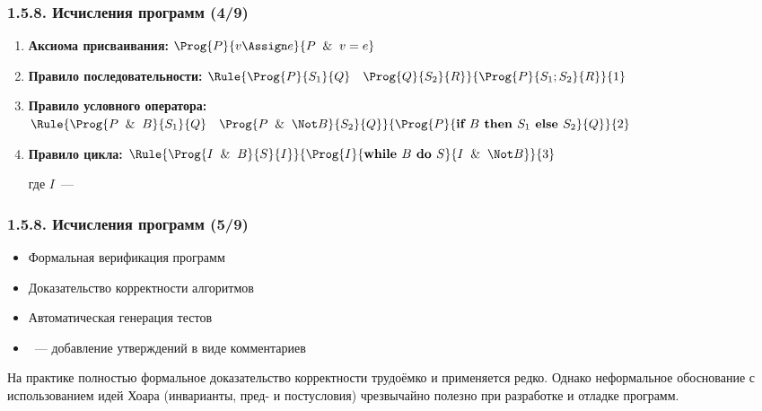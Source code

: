 \begin{frame}
\frametitle{1.5.8. Исчисления программ (4/9)}


\begin{enumerate}
\item \textbf{Аксиома присваивания:}
$\Prog{P}{v \Assign e}{P \And v = e}$

\item \textbf{Правило последовательности:}
$\Rule{\Prog{P}{S_1}{Q} \quad \Prog{Q}{S_2}{R}}{\Prog{P}{S_1; S_2}{R}}{1}$

\item \textbf{Правило условного оператора:}
$\Rule{\Prog{P \And B}{S_1}{Q} \quad \Prog{P \And \Not B}{S_2}{Q}}
{\Prog{P}{\textbf{if } B \textbf{ then } S_1 \textbf{ else } S_2}{Q}}{2}$

\item \textbf{Правило цикла:}
$\Rule{\Prog{I \And B}{S}{I}}
{\Prog{I}{\textbf{while } B \textbf{ do } S}{I \And \Not B}}{3}$

где $I$~--- 
\end{enumerate}

\end{frame}



\begin{frame}
\frametitle{1.5.8. Исчисления программ (5/9)}

\begin{itemize}
\item Формальная верификация программ
\item Доказательство корректности алгоритмов
\item Автоматическая генерация тестов
\item {}~--- 
добавление утверждений в виде комментариев
\end{itemize}

\begin{digress}
На практике полностью формальное доказательство корректности 
трудоёмко и применяется редко. 
Однако неформальное обоснование с использованием идей Хоара 
(инварианты, пред- и постусловия) чрезвычайно полезно 
при разработке и отладке программ.
\end{digress}

\end{frame}


